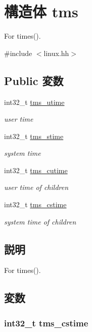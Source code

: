 \hypertarget{structPowerLinux_1_1tms}{
\section{構造体 tms}
\label{structPowerLinux_1_1tms}
}


For times().  


{\ttfamily \#include $<$linux.hh$>$}\subsection*{Public 変数}
\begin{DoxyCompactItemize}
\item 
int32\_\-t \hyperlink{structPowerLinux_1_1tms_ab653476c9f49aba7c1c0a2b3bf0ea5bf}{tms\_\-utime}
\begin{DoxyCompactList}\small\item\em user time \item\end{DoxyCompactList}\item 
int32\_\-t \hyperlink{structPowerLinux_1_1tms_a8538f2f33ab27e739791168aae55f252}{tms\_\-stime}
\begin{DoxyCompactList}\small\item\em system time \item\end{DoxyCompactList}\item 
int32\_\-t \hyperlink{structPowerLinux_1_1tms_a1a6cb5b8afe4daa7206ed2483504f546}{tms\_\-cutime}
\begin{DoxyCompactList}\small\item\em user time of children \item\end{DoxyCompactList}\item 
int32\_\-t \hyperlink{structPowerLinux_1_1tms_a466a5cdb950adbb4cde0a598402d5717}{tms\_\-cstime}
\begin{DoxyCompactList}\small\item\em system time of children \item\end{DoxyCompactList}\end{DoxyCompactItemize}


\subsection{説明}
For times(). 

\subsection{変数}
\hypertarget{structPowerLinux_1_1tms_a466a5cdb950adbb4cde0a598402d5717}{
\subsubsection[{tms\_\-cstime}]{\setlength{\rightskip}{0pt plus 5cm}int32\_\-t {\bf tms\_\-cstime}}}
\label{structPowerLinux_1_1tms_a466a5cdb950adbb4cde0a598402d5717}


